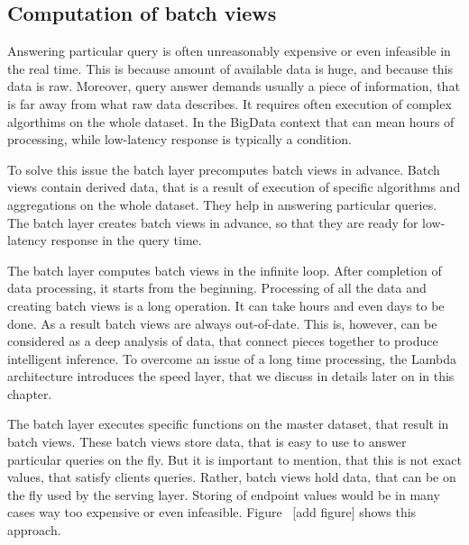 \subsection{Computation of batch views}

Answering particular query is often unreasonably expensive or even infeasible in the real time.
This is because amount of available data is huge, and because this data is raw. 
Moreover, query answer demands usually a piece of information, that is far away from what raw data describes.
It requires often execution of complex algorthims on the whole dataset.
In the BigData context that can mean hours of processing, while low-latency response is typically a condition.

To solve this issue the batch layer precomputes batch views in advance.
Batch views contain derived data, that is a result of execution of specific algorithms and aggregations on the whole dataset.
They help in answering particular queries.
The batch layer creates batch views in advance, so that they are ready for low-latency response in the query time.

The batch layer computes batch views in the infinite loop.
After completion of data processing, it starts from the beginning.
Processing of all the data and creating batch views is a long operation.
It can take hours and even days to be done.
As a result batch views are always out-of-date.
This is, however, can be considered as a deep analysis of data, that connect pieces together to produce intelligent inference.
To overcome an issue of a long time processing, the Lambda architecture introduces the speed layer, that we discuss in details later on in this chapter.

The batch layer executes specific functions on the master dataset, that result in batch views.
These batch views store data, that is easy to use to answer particular queries on the fly.
But it is important to mention, that this is not exact values, that satisfy clients queries.
Rather, batch views hold data, that can be on the fly used by the serving layer.
Storing of endpoint values would be in many cases way too expensive or even infeasible.
Figure~ [add figure] shows this approach.

